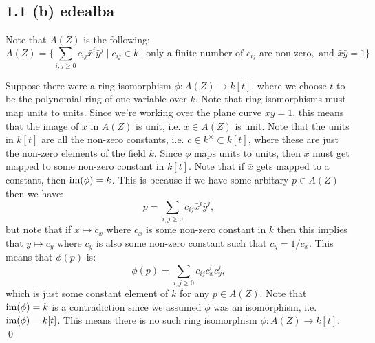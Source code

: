   \subsection*{1.1 (b)   {edealba}}

Note that $A(Z)$ is the following:
$$ A(Z) = \Bigg\{ \sum_{i, j \geq 0} c_{ij}\bar{x}^i\bar{y}^j \mid c_{ij} \in k, \text{ only a finite number of $c_{ij}$ are non-zero}, \text{ and } \bar{x}\bar{y}=1  \Bigg\} $$

Suppose there were a ring isomorphism $\phi: A(Z) \to k[t]$, where we choose $t$ to be the polynomial ring of one variable over $k$. Note that ring isomorphisms must map units to units. Since we're working over the plane curve $xy = 1$, this means that the image of $x$ in $A(Z)$ is unit, i.e. $\bar{x} \in A(Z)$ is unit. Note that the units in $k[t]$ are all the non-zero constants, i.e. $c \in k^{\times} \subset k[t]$, where these are just the non-zero elements of the field $k$. Since $\phi$ maps units to units, then $\bar{x}$ must get mapped to some non-zero constant in $k[t]$. Note that if $\bar{x}$ gets mapped to a constant, then $\text{im}(\phi) = k$. This is because if we have some arbitary $p \in A(Z)$ then we have:
$$ p = \sum_{i, j \geq 0} c_{ij}\bar{x}^i\bar{y}^j, $$
but note that if $\bar{x}\mapsto c_x$ where $c_x$ is some non-zero constant in $k$ then this implies that $\bar{y}\mapsto c_y$ where $c_y$ is also some non-zero constant such that $c_y = 1/c_x$. This means that $\phi(p)$ is:
$$ \phi(p) = \sum_{i, j \geq 0} c_{ij}c_x^{i} c_y^{j}, $$
which is just some constant element of $k$ for any $p \in A(Z)$. Note that $\text{im}(\phi) = k$ is a contradiction since we assumed $\phi$ was an isomorphism, i.e. $\text{im}(\phi) = k[t]$. This means there is no such ring isomorphism $\phi: A(Z) \to k[t]$. \qed
